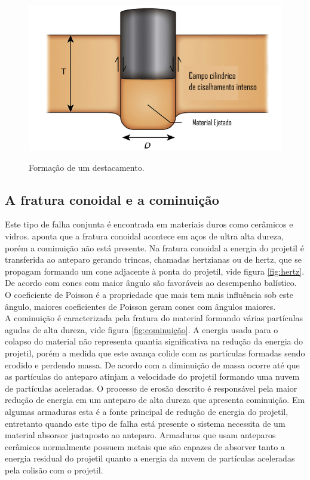    \begin{figure}[H]
 	\centering
 	\caption{Formação de um destacamento.}
 	\includegraphics[width=0.5\linewidth]{images/plugging.png}
 	\label{fig:furocilindro}
 \end{figure}
 
 \subsection{A fratura conoidal e a cominuição}
 Este tipo de falha conjunta é encontrada em materiais duros como cerâmicos e vidros. \cite{Crouch} aponta que a fratura conoidal acontece em aços de ultra alta dureza, porém a cominuição não está presente. Na fratura conoidal a energia do projetil é transferida ao anteparo gerando trincas, chamadas hertzianas ou de hertz, que se propagam formando um cone adjacente à ponta do projetil, vide figura \ref{fig:hertz}. De acordo com \cite{Crouch} cones com maior ângulo são favoráveis ao desempenho balístico. O coeficiente de Poisson é a propriedade que mais tem mais influência sob este ângulo, maiores coeficientes de Poisson geram cones com ângulos maiores. \\
 
 A cominuição é caracterizada pela fratura do material formando várias partículas agudas de alta dureza, vide figura \ref{fig:cominuição}. A energia usada para o colapso do material não representa quantia significativa na redução da energia do projetil, porém a medida que este avança colide com as partículas formadas sendo erodido e perdendo massa. De acordo com \cite{neckel} a diminuição de massa ocorre até que as partículas do anteparo atinjam a velocidade do projetil  formando uma nuvem de partículas aceleradas. O processo de erosão descrito é responsável pela maior redução de energia em um anteparo de alta dureza que apresenta cominuição. Em algumas armaduras esta é a fonte principal de redução de energia do projetil, entretanto quando este tipo de falha está presente o sistema necessita de um material absorsor justaposto ao anteparo. Armaduras que usam anteparos cerâmicos normalmente possuem metais que são capazes de absorver tanto a energia residual do projetil quanto a energia da nuvem de partículas aceleradas pela colisão com o projetil.

